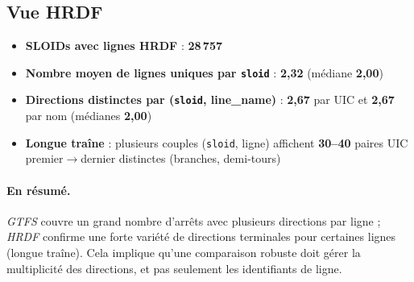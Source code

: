 \subsection*{Vue HRDF}
\begin{itemize}
  \item \textbf{SLOIDs avec lignes HRDF} : \textbf{28\,757}
  \item \textbf{Nombre moyen de lignes uniques par \texttt{sloid}} : \textbf{2,32} (médiane \textbf{2,00})
  \item \textbf{Directions distinctes par (\texttt{sloid}, line\_name)} : \textbf{2,67} par UIC et \textbf{2,67} par nom (médianes \textbf{2,00})
  \item \textbf{Longue traîne} : plusieurs couples (\texttt{sloid}, ligne) affichent \textbf{30--40} paires UIC premier$\rightarrow$dernier distinctes (branches, demi-tours)
\end{itemize}

\paragraph{En résumé.} \emph{GTFS} couvre un grand nombre d'arrêts avec plusieurs directions par ligne ; \emph{HRDF} confirme une forte variété de directions terminales pour certaines lignes (longue traîne). Cela implique qu'une comparaison robuste doit gérer la multiplicité des directions, et pas seulement les identifiants de ligne.

